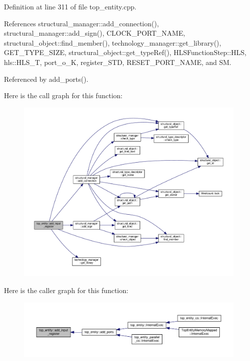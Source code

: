 Definition at line 311 of file top\+\_\+entity.\+cpp.



References structural\+\_\+manager\+::add\+\_\+connection(), structural\+\_\+manager\+::add\+\_\+sign(), C\+L\+O\+C\+K\+\_\+\+P\+O\+R\+T\+\_\+\+N\+A\+ME, structural\+\_\+object\+::find\+\_\+member(), technology\+\_\+manager\+::get\+\_\+library(), G\+E\+T\+\_\+\+T\+Y\+P\+E\+\_\+\+S\+I\+ZE, structural\+\_\+object\+::get\+\_\+type\+Ref(), H\+L\+S\+Function\+Step\+::\+H\+LS, hls\+::\+H\+L\+S\+\_\+T, port\+\_\+o\+\_\+K, register\+\_\+\+S\+TD, R\+E\+S\+E\+T\+\_\+\+P\+O\+R\+T\+\_\+\+N\+A\+ME, and SM.



Referenced by add\+\_\+ports().

Here is the call graph for this function\+:
\nopagebreak
\begin{figure}[H]
\begin{center}
\leavevmode
\includegraphics[width=350pt]{d0/d0e/classtop__entity_ad1949a318419093124c6a05b5823d0b2_cgraph}
\end{center}
\end{figure}
Here is the caller graph for this function\+:
\nopagebreak
\begin{figure}[H]
\begin{center}
\leavevmode
\includegraphics[width=350pt]{d0/d0e/classtop__entity_ad1949a318419093124c6a05b5823d0b2_icgraph}
\end{center}
\end{figure}
\mbox{\label{classtop__entity_ad63b0b997f3905f591e00e26d07f5b86}} 
